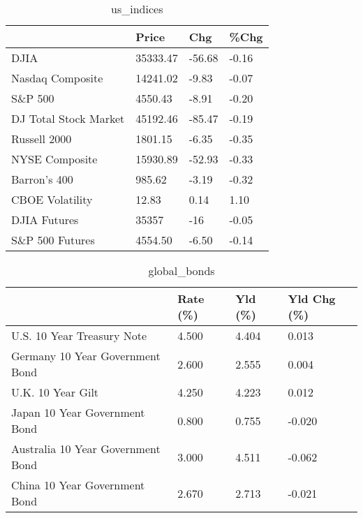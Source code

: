 \documentclass{article}%
\begin{document}
%


\begin{table}[htbp]%
\caption{us\_indices}%
\centering%
\begin{adjustbox}{width=1\textwidth}%
\begin{tabular}{llll}
\toprule
                      &    Price &    Chg &  \%Chg \\
\midrule
                 DJIA & 35333.47 & -56.68 & -0.16 \\
     Nasdaq Composite & 14241.02 &  -9.83 & -0.07 \\
              S\&P 500 &  4550.43 &  -8.91 & -0.20 \\
DJ Total Stock Market & 45192.46 & -85.47 & -0.19 \\
         Russell 2000 &  1801.15 &  -6.35 & -0.35 \\
       NYSE Composite & 15930.89 & -52.93 & -0.33 \\
         Barron's 400 &   985.62 &  -3.19 & -0.32 \\
      CBOE Volatility &    12.83 &   0.14 &  1.10 \\
         DJIA Futures &    35357 &    -16 & -0.05 \\
      S\&P 500 Futures &  4554.50 &  -6.50 & -0.14 \\
\bottomrule
\end{tabular}
%
\end{adjustbox}%
\end{table}

%


\begin{table}[htbp]%
\caption{global\_bonds}%
\centering%
\begin{adjustbox}{width=1\textwidth}%
\begin{tabular}{llll}
\toprule
                                  & Rate (\%) & Yld (\%) & Yld Chg (\%) \\
\midrule
       U.S. 10 Year Treasury Note &    4.500 &   4.404 &       0.013 \\
  Germany 10 Year Government Bond &    2.600 &   2.555 &       0.004 \\
                U.K. 10 Year Gilt &    4.250 &   4.223 &       0.012 \\
    Japan 10 Year Government Bond &    0.800 &   0.755 &      -0.020 \\
Australia 10 Year Government Bond &    3.000 &   4.511 &      -0.062 \\
    China 10 Year Government Bond &    2.670 &   2.713 &      -0.021 \\
\bottomrule
\end{tabular}
%
\end{adjustbox}%
\end{table}
\end{document}
